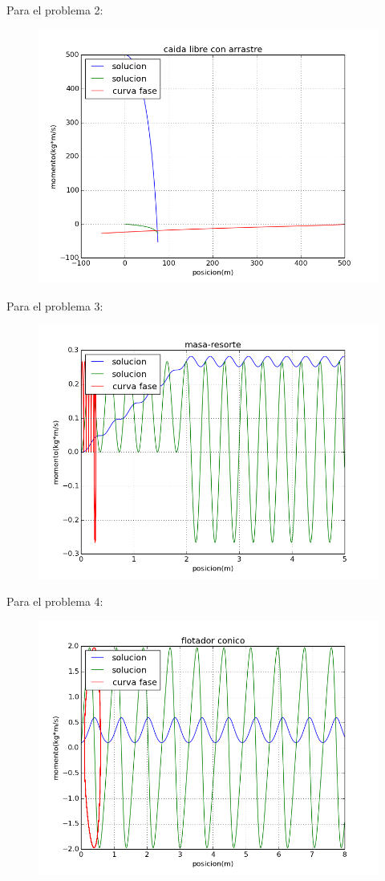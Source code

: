 \documentclass[letterpaper]{article}
\begin{document}
Para el problema 2:
\begin{figure}[H]
	\centering
	\includegraphics[scale=0.5]{Problema2_Ricardo.png} 
\end{figure}
Para el problema 3:
\begin{figure}[H]
	\centering
	\includegraphics[scale=0.5]{Problema3_Ricardo.png} 
\end{figure}
Para el problema 4:
\begin{figure}[H]
	\centering
	\includegraphics[scale=0.5]{Problema4_Ricardo.png} 
\end{figure}
\end{document}
